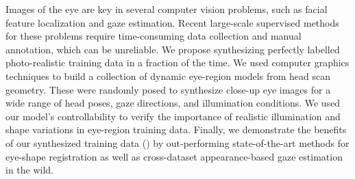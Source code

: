 Images of the eye are key in several computer vision problems, such as facial feature localization and gaze estimation.
Recent large-scale supervised methods for these problems require time-consuming data collection and manual annotation, which can be unreliable.
We propose synthesizing perfectly labelled photo-realistic training data in a fraction of the time.
We used computer graphics techniques to build a collection of dynamic eye-region models from head scan geometry.
These were randomly posed to synthesize close-up eye images for a wide range of head poses, gaze directions, and illumination conditions.
%
We used our model's controllability to verify the importance of realistic illumination and shape variations in eye-region training data.
%
Finally, we demonstrate the benefits of our synthesized training data (\dataset) by out-performing state-of-the-art methods for eye-shape registration as well as cross-dataset appearance-based gaze estimation in the wild.
